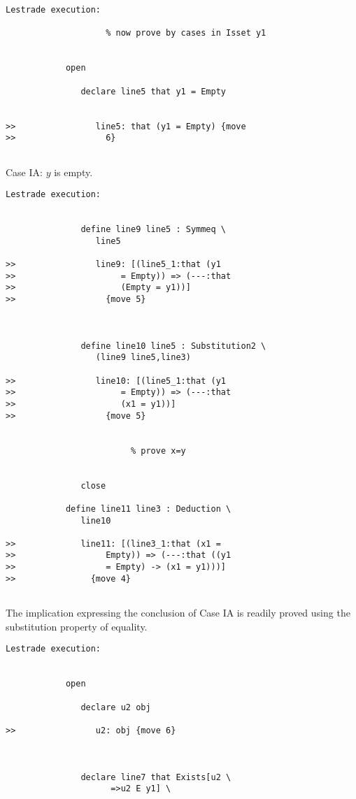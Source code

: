 \documentclass{article}
\begin{document}
{\begin{verbatim}Lestrade execution:

                    % now prove by cases in Isset y1


            open

               declare line5 that y1 = Empty


>>                line5: that (y1 = Empty) {move
>>                  6}


\end{verbatim}


Case IA:  $y$ is empty.

\begin{verbatim}Lestrade execution:


               define line9 line5 : Symmeq \
                  line5

>>                line9: [(line5_1:that (y1
>>                     = Empty)) => (---:that
>>                     (Empty = y1))]
>>                  {move 5}



               define line10 line5 : Substitution2 \
                  (line9 line5,line3)

>>                line10: [(line5_1:that (y1
>>                     = Empty)) => (---:that
>>                     (x1 = y1))]
>>                  {move 5}


                         % prove x=y


               close

            define line11 line3 : Deduction \
               line10

>>             line11: [(line3_1:that (x1 =
>>                  Empty)) => (---:that ((y1
>>                  = Empty) -> (x1 = y1)))]
>>               {move 4}


\end{verbatim}

The implication expressing the conclusion of Case IA is readily proved using the substitution property of equality.

\begin{verbatim}Lestrade execution:


            open

               declare u2 obj

>>                u2: obj {move 6}



               declare line7 that Exists[u2 \
                     =>u2 E y1] \
                  




\end{verbatim}}
\end{document}
